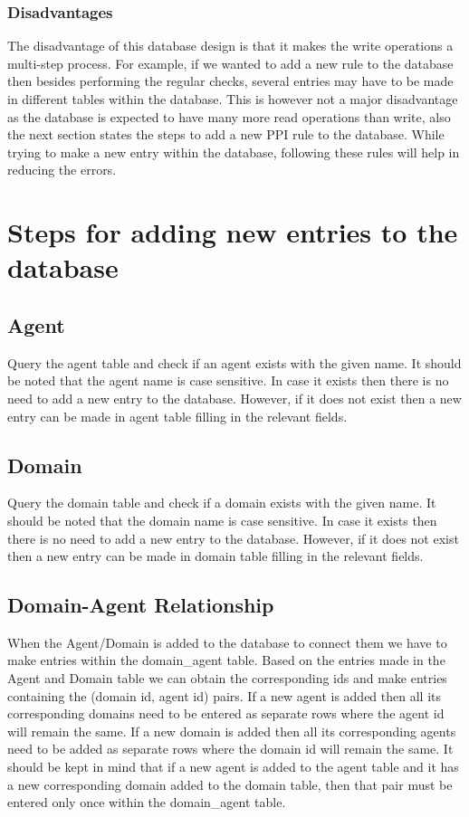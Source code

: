 \documentclass[msc,deptreport,ai]{infthesis}      %
\begin{document}
 \subsubsection{Disadvantages}
 The disadvantage of this database design is that it makes the write operations a multi-step process. For example, if we wanted to add a new rule to the database then besides performing the regular checks, several entries may have to be made in different tables within the database. This is however not a major disadvantage as the database is expected to have many more read operations than write, also the next section states the steps to add a new PPI rule to the database. While trying to make a new entry within the database, following these rules will help in reducing the errors.
\section{Steps for adding new entries to the database}
\subsection{Agent}
	Query the agent table and check if an agent exists with the given name. It should be noted that the agent name is case sensitive. In case it exists then there is no need to add a new entry to the database. However, if it does not exist then a new entry can be made in agent table filling in the relevant fields. 
\subsection{Domain}
	Query the domain table and check if a domain exists with the given name. It should be noted that the domain name is case sensitive. In case it exists then there is no need to add a new entry to the database. However, if it does not exist then a new entry can be made in domain table filling in the relevant fields. 
\subsection{Domain-Agent Relationship}
	When the Agent/Domain is added to the database to connect them we have to make entries within the domain\_agent table. Based on the entries made in the Agent and Domain table we can obtain the corresponding ids and make entries containing the (domain id, agent id) pairs. If a new agent is added then all its corresponding domains need to be entered as separate rows where the agent id will remain the same. If a new domain is added then all its corresponding agents need to be added as separate rows where the domain id will remain the same. 	
	It should be kept in mind that if a new agent is added to the agent table and it has a new corresponding domain added to the domain table, then that pair must be entered only once within the domain\_agent table.	
\end{document}
